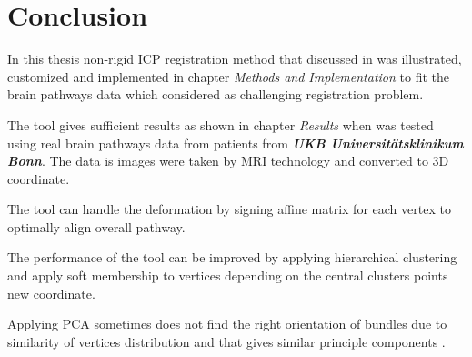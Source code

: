 \documentclass[../structure.tex]{subfiles}
\begin{document}
\chapter{Conclusion}
In this thesis non-rigid ICP registration method that discussed in \cite{Amberg2007} was illustrated, customized and implemented in chapter \textit{Methods and Implementation} to fit the brain pathways data which considered as challenging registration problem.

The tool gives sufficient results as shown in chapter \textit{Results} when was tested using real brain pathways data from patients from \textbf{\textit{UKB Universitätsklinikum Bonn}}. The data is images were taken by MRI technology and converted to 3D coordinate.

The tool can handle the deformation by signing affine matrix for each vertex to optimally align overall pathway.

The performance of the tool can be improved by applying hierarchical clustering and apply soft membership to vertices depending on the central clusters points new coordinate.

Applying PCA sometimes does not find the right orientation of bundles due to similarity of vertices distribution and that gives similar principle components .
\end{document}
